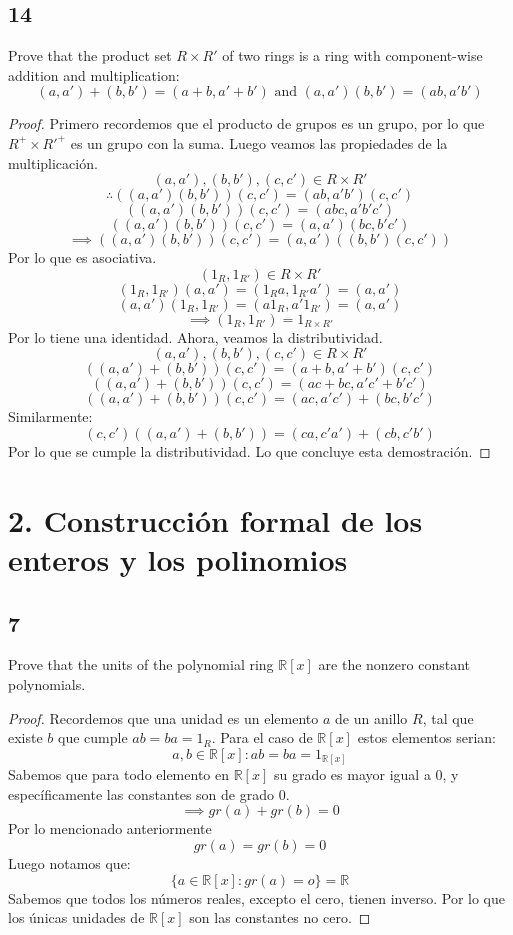 \documentclass[11pt]{article}
\newcommand{\set}[1]{\mathbb{#1}}
\theoremstyle{definition}
\begin{document}
        \subsection{14}
        Prove that the product set $R\times R'$ of two rings is a ring with component-wise addition and multiplication:
        \[(a,a')+(b,b')=(a+b,a'+b')\textrm{ and }(a,a')(b,b')=(ab,a'b')\]
        \begin{proof}
            Primero recordemos que el producto de grupos es un grupo, por lo que $R^+\times R'^+$ es un grupo con la suma. Luego veamos las propiedades de la multiplicación.
            \[(a,a'),(b,b'),(c,c')\in R\times R'\]
            \[\therefore ((a,a')(b,b'))(c,c')=(ab,a'b')(c,c')\]
            \[((a,a')(b,b'))(c,c')=(abc,a'b'c')\]
            \[((a,a')(b,b'))(c,c')=(a,a')(bc,b'c')\]
            \[\implies ((a,a')(b,b'))(c,c')=(a,a')((b,b')(c,c'))\]
            Por lo que es asociativa.
            \[(1_R,1_{R'})\in R\times R'\]
            \[(1_R,1_{R'})(a,a')=(1_Ra,1_{R'}a')=(a,a')\]
            \[(a,a')(1_R,1_{R'})=(a1_R,a'1_{R'})=(a,a')\]
            \[\implies (1_R,1_{R'})=1_{R\times R'}\]
            Por lo tiene una identidad. Ahora, veamos la distributividad.
            \[(a,a'),(b,b'),(c,c')\in R\times R'\]
            \[\left((a,a')+(b,b')\right)(c,c')=(a+b,a'+b')(c,c')\]
            \[\left((a,a')+(b,b')\right)(c,c')=(ac+bc,a'c'+b'c')\]
            \[\left((a,a')+(b,b')\right)(c,c')=(ac,a'c')+(bc,b'c')\]
            Similarmente:
            \[(c,c')\left((a,a')+(b,b')\right)=(ca,c'a')+(cb,c'b')\]
            Por lo que se cumple la distributividad. Lo que concluye esta demostración.
        \end{proof}

        \section{2. Construcción formal de los enteros y los polinomios}
        \subsection{7}
        Prove that the units of the polynomial ring $\set{R}[x]$ are the nonzero constant polynomials.
        \begin{proof}
            Recordemos que una unidad es un elemento $a$ de un anillo $R$, tal que existe $b$ que cumple $ab=ba=1_R$. Para el caso de $\set{R}[x]$ estos elementos serian:
            \[a,b\in\set{R}[x]:ab=ba=1_{\set{R}[x]}\]
            Sabemos que para todo elemento en $\set{R}[x]$ su grado es mayor igual a 0, y específicamente las constantes son de grado 0.
            \[\implies gr(a)+gr(b)=0\]
            Por lo mencionado anteriormente
            \[gr(a)=gr(b)=0\]
            Luego notamos que:
            \[\{a\in\set{R}[x]:gr(a)=o\}=\set{R}\]
            Sabemos que todos los números reales, excepto el cero, tienen inverso. Por lo que los únicas unidades de $\set{R}[x]$ son las constantes no cero.
        \end{proof}
\end{document}
